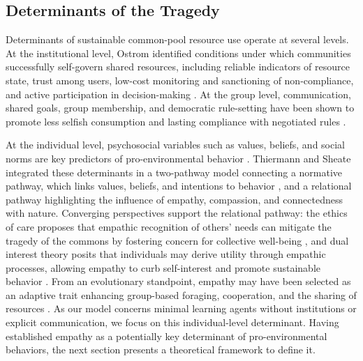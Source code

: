 \subsection{Determinants of the Tragedy}
Determinants of sustainable common-pool resource use operate at several levels. At the institutional level, Ostrom identified conditions under which communities successfully self-govern shared resources, including reliable indicators of resource state, trust among users, low-cost monitoring and sanctioning of non-compliance, and active participation in decision-making \cite{ostromRevisitingCommonsLocal1999,ostromGeneralFrameworkAnalyzing2009}. At the group level, communication, shared goals, group membership, and democratic rule-setting have been shown to promote less selfish consumption and lasting compliance with negotiated rules \cite{rabinovichProtectingCommonsPredictors2020,cuadradoRoleProsocialnessTrust2017,decaroSynergisticEffectsVoting2015,decaroMotivationalFoundationsCommunication2021}.

At the individual level, psychosocial variables such as values, beliefs, and social norms are key predictors of pro-environmental behavior \cite{fornaraExtendedValueBeliefNormTheory2020,guoResidentialElectricityConsumption2018,liWhatInfluencesIndividuals2019,sussmanProEnvironmentalValuesMatter2016}. Thiermann and Sheate \cite{thiermannMotivatingIndividualsSocial2020} integrated these determinants in a two-pathway model connecting a normative pathway, which links values, beliefs, and intentions to behavior \cite{sternValuebeliefnormTheorySupport1999,ajzenTheoryPlannedBehavior1991}, and a relational pathway highlighting the influence of empathy, compassion, and connectedness with nature. Converging perspectives support the relational pathway: the ethics of care proposes that empathic recognition of others' needs can mitigate the tragedy of the commons by fostering concern for collective well-being \cite{moreno-casasEthicsCareTragedy2021}, and dual interest theory posits that individuals may derive utility through empathic processes, allowing empathy to curb self-interest and promote sustainable behavior \cite{lynneTheoreticalFoundationEmpathy2016}. From an evolutionary standpoint, empathy may have been selected as an adaptive trait enhancing group-based foraging, cooperation, and the sharing of resources \cite{tomaselloTwoKeySteps2012,tomaselloOriginsHumanCooperation2013,cuffEmpathyReviewConcept2016,decetyEmergenceEmpathyDevelopmental2021}. As our model concerns minimal learning agents without institutions or explicit communication, we focus on this individual-level determinant. Having established empathy as a potentially key determinant of pro-environmental behaviors, the next section presents a theoretical framework to define it.



